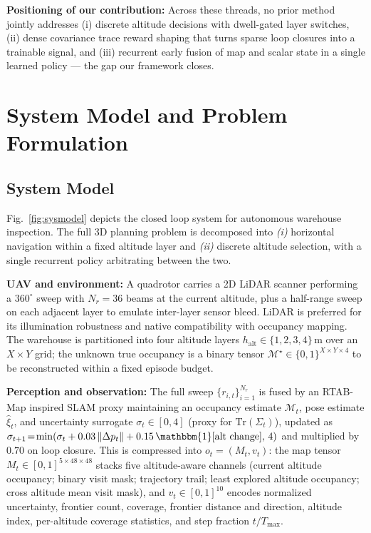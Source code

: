 \documentclass[conference]{IEEEtran}
\begin{document}
\textbf{Positioning of our contribution:} Across these threads, no prior method jointly addresses (i) discrete altitude decisions with dwell-gated layer switches, (ii) dense covariance trace reward shaping that turns sparse loop closures into a trainable signal, and (iii) recurrent early fusion of map and scalar state in a single learned policy --- the gap our framework closes.

\section{System Model and Problem Formulation}

\subsection{System Model}
Fig.~\ref{fig:sysmodel} depicts the closed loop system for autonomous warehouse inspection. The full 3D planning problem is decomposed into \emph{(i)} horizontal navigation within a fixed altitude layer and \emph{(ii)} discrete altitude selection, with a single recurrent policy arbitrating between the two.

\textbf{UAV and environment:} A quadrotor carries a 2D LiDAR scanner performing a $360^\circ$ sweep with $N_r\!=\!36$ beams at the current altitude, plus a half-range sweep on each adjacent layer to emulate inter-layer sensor bleed. LiDAR is preferred for its illumination robustness and native compatibility with occupancy mapping. The warehouse is partitioned into four altitude layers $h_{\text{alt}}\!\in\!\{1,2,3,4\}\,\text{m}$ over an $X\!\times\!Y$ grid; the unknown true occupancy is a binary tensor $\mathcal{M}^{\star}\!\in\!\{0,1\}^{X\times Y\times 4}$ to be reconstructed within a fixed episode budget.

\textbf{Perception and observation:} The full sweep $\{r_{i,t}\}_{i=1}^{N_r}$ is fused by an RTAB-Map inspired SLAM proxy maintaining an occupancy estimate $\mathcal{M}_t$, pose estimate $\hat{\xi}_t$, and uncertainty surrogate $\sigma_t\!\in\![0,4]$ (proxy for $\mathrm{Tr}(\Sigma_t)$), updated as $\sigma_{t+1}\!=\!\min(\sigma_t + 0.03\,\|\Delta p_t\| + 0.15\,\mathbbm{1}[\text{alt change}],\,4)$ and multiplied by $0.70$ on loop closure. This is compressed into $o_t\!=\!(M_t,v_t)$: the map tensor $M_t\!\in\![0,1]^{5\times 48\times 48}$ stacks five altitude-aware channels (current altitude occupancy; binary visit mask; trajectory trail; least explored altitude occupancy; cross altitude mean visit mask), and $v_t\!\in\![0,1]^{10}$ encodes normalized uncertainty, frontier count, coverage, frontier distance and direction, altitude index, per-altitude coverage statistics, and step fraction $t/T_{\max}$.
\end{document}
